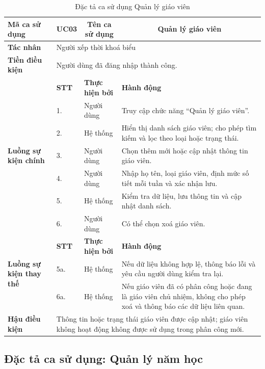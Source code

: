 \documentclass[../DoAn.tex]{subfiles}
\begin{document}
\begin{longtable}{|p{2.8cm}|p{1cm}|p{2.8cm}|p{6.3cm}|}
\caption{Đặc tả ca sử dụng Quản lý giáo viên}
\label{tab:app_uc_quan_ly_giao_vien} \\
\hline
\multicolumn{1}{|l|}{\textbf{Mã ca sử dụng}} & \multicolumn{1}{c|}{UC03} &
\multicolumn{1}{c|}{\textbf{Tên ca sử dụng}} & \multicolumn{1}{c|}{Quản lý giáo viên} \\
\hline
\multicolumn{1}{|l|}{\textbf{Tác nhân}} & \multicolumn{3}{l|}{Người xếp thời khoá biểu} \\
\hline
\multicolumn{1}{|l|}{\textbf{Tiền điều kiện}} & \multicolumn{3}{l|}{Người dùng đã đăng nhập thành công.} \\
\hline
\multirow{7}{2.8cm}{\textbf{Luồng sự kiện chính}} & \textbf{STT} & \textbf{Thực hiện bởi} & \textbf{Hành động} \\
\cline{2-4}
& 1. & Người dùng & Truy cập chức năng ``Quản lý giáo viên''. \\
\cline{2-4}
& 2. & Hệ thống & Hiển thị danh sách giáo viên; cho phép tìm kiếm và lọc theo loại hoặc trạng thái. \\
\cline{2-4}
& 3. & Người dùng & Chọn thêm mới hoặc cập nhật thông tin giáo viên. \\
\cline{2-4}
& 4. & Người dùng & Nhập họ tên, loại giáo viên, định mức số tiết mỗi tuần và xác nhận lưu. \\
\cline{2-4}
& 5. & Hệ thống & Kiểm tra dữ liệu, lưu thông tin và cập nhật danh sách. \\
\cline{2-4}
& 6. & Người dùng & Có thể chọn xoá giáo viên. \\
\hline
\multirow{3}{2.8cm}{\textbf{Luồng sự kiện thay thế}} & \textbf{STT} & \textbf{Thực hiện bởi} & \textbf{Hành động} \\
\cline{2-4}
& 5a. & Hệ thống & Nếu dữ liệu không hợp lệ, thông báo lỗi và yêu cầu người dùng kiểm tra lại. \\
\cline{2-4}
& 6a. & Hệ thống & Nếu giáo viên đã có phân công hoặc đang là giáo viên chủ nhiệm, không cho phép xoá và thông báo các dữ liệu liên quan. \\
\hline
\multicolumn{1}{|l|}{\textbf{Hậu điều kiện}} & \multicolumn{3}{p{10.5cm}|}{Thông tin hoặc trạng thái giáo viên được cập nhật; giáo viên không hoạt động không được sử dụng trong phân công mới.} \\
\hline
\end{longtable}

\subsection{Đặc tả ca sử dụng: Quản lý năm học}
\end{document}

